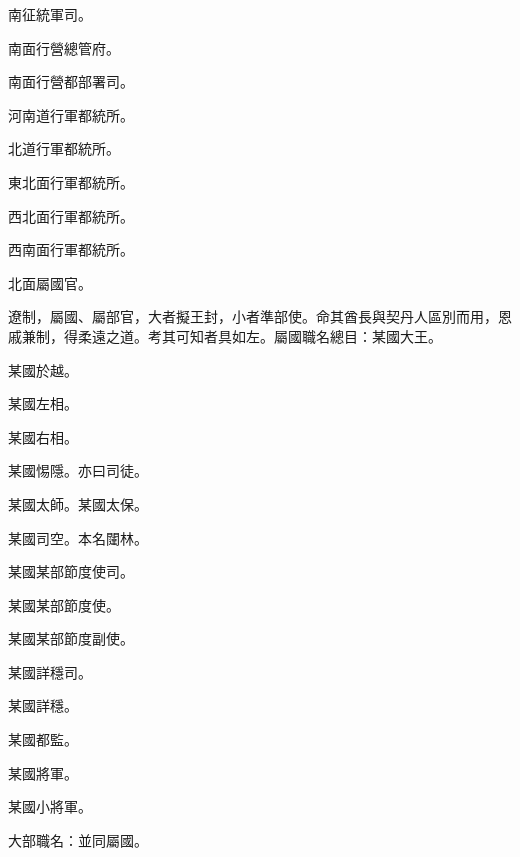 \begin{pinyinscope}
 南征統軍司。



 南面行營總管府。



 南面行營都部署司。



 河南道行軍都統所。



 北道行軍都統所。



 東北面行軍都統所。



 西北面行軍都統所。



 西南面行軍都統所。



 北面屬國官。



 遼制，屬國、屬部官，大者擬王封，小者準部使。命其酋長與契丹人區別而用，恩戚兼制，得柔遠之道。考其可知者具如左。屬國職名總目：某國大王。



 某國於越。



 某國左相。



 某國右相。



 某國惕隱。亦曰司徒。



 某國太師。某國太保。



 某國司空。本名闥林。



 某國某部節度使司。



 某國某部節度使。



 某國某部節度副使。



 某國詳穩司。



 某國詳穩。



 某國都監。



 某國將軍。



 某國小將軍。



 大部職名：並同屬國。




\end{pinyinscope}
